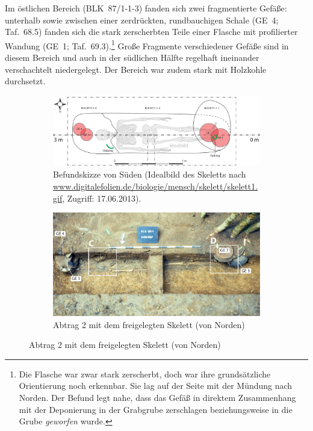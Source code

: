 Im östlichen Bereich (BLK~87/1-1-3) fanden sich zwei fragmentierte Gefäße: unterhalb sowie zwischen einer zerdrückten, rundbauchigen Schale (GE~4; Taf.~68.5) fanden sich die stark zerscherbten Teile einer Flasche mit profilierter Wandung (GE~1; Taf.~69.3).\footnote{Die Flasche war zwar stark zerscherbt, doch war ihre grundsätzliche Orientierung noch erkennbar. Sie lag auf der Seite mit der Mündung nach Norden. Der Befund legt nahe, dass das Gefäß in direktem Zusammenhang mit der Deponierung in der Grabgrube zerschlagen beziehungsweise in die Grube \textit{geworfen} wurde.} Große Fragmente verschiedener Gefäße sind in diesem Bereich und auch in der südlichen Hälfte regelhaft ineinander verschachtelt niedergelegt. Der Bereich war zudem stark mit Holzkohle durchsetzt.

\begin{figure}[p]
	\centering
	\begin{subfigure}[t]{\textwidth} 
		\centering
		\includegraphics[width = \textwidth]{fig/BLK87-1_Skizzen.pdf}
		\caption{Befundskizze von Süden (Idealbild des Skeletts nach \url{www.digitalefolien.de/biologie/mensch/skelett/skelett1.gif}, Zugriff: 17.06.2013).}
		\label{fig:BLK87-1_Skizze}
	\end{subfigure}
	\begin{subfigure}[t]{\textwidth} 
		\centering
		\includegraphics[width = \textwidth]{fig/BLK87-1_F87-01-28.pdf}
		\caption{Abtrag 2 mit dem freigelegten Skelett (von Norden)}

\end{subfigure}
\end{figure}

